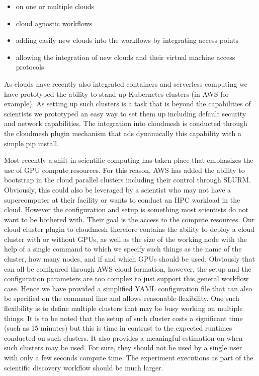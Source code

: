 \documentclass[utf8]{FrontiersinVancouver} %
\begin{document}
\begin{itemize}
    \item on one or multiple clouds
    \item cloud agnostic workflows
    \item adding easily new clouds into the workflows by integrating access points
    \item allowing the integration of new clouds and their virtual machine access protocols
\end{itemize}

As clouds have recently also integrated containers and serverless computing we have prototyped the ability to stand up Kubernetes clusters (in AWS for example). As setting up such clusters is a task that is beyond the capabilities of scientists we prototyped an easy way to set them up including default security and network capabilities. The integration into cloudmesh is conducted through the cloudmesh plugin mechanism that ads dynamically this capability with a simple pip install.

Most recently a shift in scientific computing has taken place that emphasizes the use of GPU compute resources. For this reason, AWS has added the ability to bootstrap in the cloud parallel clusters including their control through SLURM. Obviously, this could also be leveraged by a scientist who may not have a supercomputer at their facility or wants to conduct an HPC workload in the cloud. However the configuration and setup is something most scientists do not want to be bothered with. Their goal is the access to the compute resources. Our cloud cluster plugin to cloudmesh therefore contains the ability to deploy a cloud cluster with or without GPUs, as well as the size of the working node with the help of a single command to which we specify such things as the name of the cluster, how many nodes, and if and which GPUs should be used. Obviously that can all be configured through AWS cloud formation, however, the setup and the configuration parameters are too complex to just support this general workflow case. Hence we have provided a simplified YAML configuration file that can also be specified on the command line and allows reasonable flexibility. One such flexibility is to define multiple clusters that may be busy working on multiple things. It is to be noted that the setup of such cluster costs a significant time (such as 15 minutes) but this is time in contrast to the expected runtimes conducted on such clusters. It also provides a meaningful estimation on when such clusters may be used. For sure, they should not be used by a single user with only a few seconds compute time.  The experiment executions as part of the scientific discovery workflow should be much larger.
\end{document}
